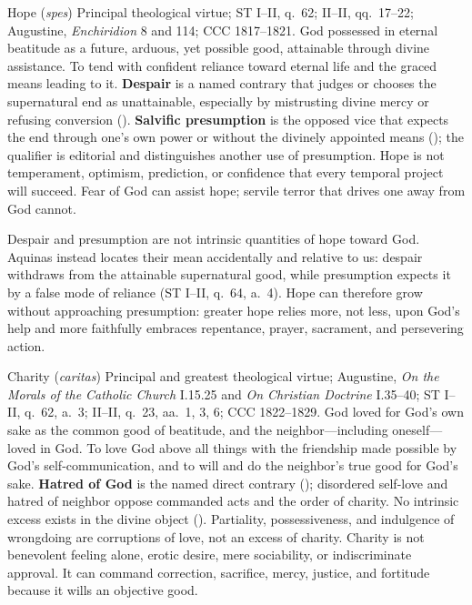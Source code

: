 \virtuedossier
  {Hope (\emph{spes})}
  {Principal theological virtue; ST I--II, q.~62; II--II, qq.~17--22; Augustine, \emph{Enchiridion} 8 and 114; CCC 1817--1821.}
  {God possessed in eternal beatitude as a future, arduous, yet possible good, attainable through divine assistance.}
  {To tend with confident reliance toward eternal life and the graced means leading to it.}
  {\textbf{Despair} is a named contrary that judges or chooses the supernatural end as unattainable, especially by mistrusting divine mercy or refusing conversion ().}
  {\textbf{Salvific presumption} is the opposed vice that expects the end through one's own power or without the divinely appointed means (); the qualifier is editorial and distinguishes another use of presumption.}
  {Hope is not temperament, optimism, prediction, or confidence that every temporal project will succeed. Fear of God can assist hope; servile terror that drives one away from God cannot.}

Despair and presumption are not intrinsic quantities of hope toward God. Aquinas instead locates their mean accidentally and relative to us: despair withdraws from the attainable supernatural good, while presumption expects it by a false mode of reliance (ST I--II, q.~64, a.~4). Hope can therefore grow without approaching presumption: greater hope relies more, not less, upon God's help and more faithfully embraces repentance, prayer, sacrament, and persevering action.

\virtuedossier
  {Charity (\emph{caritas})}
  {Principal and greatest theological virtue; Augustine, \emph{On the Morals of the Catholic Church} I.15.25 and \emph{On Christian Doctrine} I.35--40; ST I--II, q.~62, a.~3; II--II, q.~23, aa.~1, 3, 6; CCC 1822--1829.}
  {God loved for God's own sake as the common good of beatitude, and the neighbor---including oneself---loved in God.}
  {To love God above all things with the friendship made possible by God's self-communication, and to will and do the neighbor's true good for God's sake.}
  {\textbf{Hatred of God} is the named direct contrary (); disordered self-love and hatred of neighbor oppose commanded acts and the order of charity.}
  {No intrinsic excess exists in the divine object (). Partiality, possessiveness, and indulgence of wrongdoing are corruptions of love, not an excess of charity.}
  {Charity is not benevolent feeling alone, erotic desire, mere sociability, or indiscriminate approval. It can command correction, sacrifice, mercy, justice, and fortitude because it wills an objective good.}

